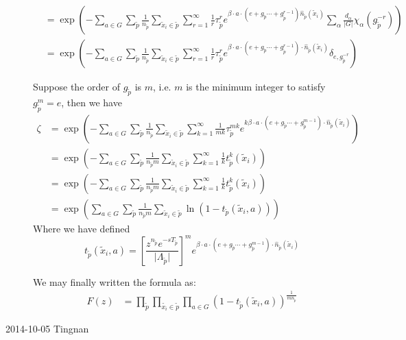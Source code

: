 \begin{description}
\begin{align*}
 & =\exp\left(-\sum_{a\in G}\sum_{\tilde{p}}\frac{1}{n_{\tilde{p}}}\sum_{\tilde{x}_{i}\in\tilde{p}}\sum_{r=1}^{\infty}\frac{1}{r}\tau_{\tilde{p}}^{r}e^{\beta\cdot a\cdot(e+g_{\tilde{p}}\cdots+g_{\tilde{p}}^{r-1})\hat{n}_{\tilde{p}}(\tilde{x}_{i})}\sum_{\alpha}\frac{d_{\alpha}}{\vert G\vert}\chi_{\alpha}(g_{\tilde{p}}^{-r})\right)\\
 & =\exp\left(-\sum_{a\in G}\sum_{\tilde{p}}\frac{1}{n_{\tilde{p}}}\sum_{\tilde{x}_{i}\in\tilde{p}}\sum_{r=1}^{\infty}\frac{1}{r}\tau_{\tilde{p}}^{r}e^{\beta\cdot a\cdot(e+g_{\tilde{p}}\cdots+g_{\tilde{p}}^{r-1})\cdot\hat{n}_{\tilde{p}}(\tilde{x}_{i})}\delta_{e,g_{\tilde{p}}^{-r}}\right)
\end{align*}


Suppose the order of $g_{\tilde{p}}$ is $m$, i.e. $m$ is the minimum
integer to satisfy $g_{\tilde{p}}^{m}=e$, then we have
\begin{align*}
\zeta & =\exp\left(-\sum_{a\in G}\sum_{\tilde{p}}\frac{1}{n_{\tilde{p}}}\sum_{\tilde{x}_{i}\in\tilde{p}}\sum_{k=1}^{\infty}\frac{1}{mk}\tau_{\tilde{p}}^{mk}e^{k\beta\cdot a\cdot(e+g_{\tilde{p}}\cdots+g_{\tilde{p}}^{m-1})\cdot\hat{n}_{\tilde{p}}(\tilde{x}_{i})}\right)\\
 & =\exp\left(-\sum_{a\in G}\sum_{\tilde{p}}\frac{1}{n_{\tilde{p}}m}\sum_{\tilde{x}_{i}\in\tilde{p}}\sum_{k=1}^{\infty}\frac{1}{k}t_{\tilde{p}}^{k}(\tilde{x}_{i})\right)\\
 & =\exp\left(-\sum_{a\in G}\sum_{\tilde{p}}\frac{1}{n_{\tilde{p}}m}\sum_{\tilde{x}_{i}\in\tilde{p}}\sum_{k=1}^{\infty}\frac{1}{k}t_{\tilde{p}}^{k}(\tilde{x}_{i})\right)\\
 & =\exp\left(\sum_{a\in G}\sum_{\tilde{p}}\frac{1}{n_{\tilde{p}}m}\sum_{\tilde{x}_{i}\in\tilde{p}}\ln\left(1-t_{\tilde{p}}(\tilde{x}_{i},a)\right)\right)
\end{align*}
Where we have defined
\[
t_{\tilde{p}}(\tilde{x}_{i},a)=\left[\frac{z^{n_{\tilde{p}}}e^{-sT_{\tilde{p}}}}{\vert\Lambda_{\tilde{p}}\vert}\right]^{m}e^{\beta\cdot a\cdot(e+g_{\tilde{p}}\cdots+g_{\tilde{p}}^{m-1})\cdot\hat{n}_{\tilde{p}}(\tilde{x}_{i})}
\]


We may finally written the formula as:
\begin{align*}
F(z) & =\prod_{\tilde{p}}\prod_{\tilde{x_{i}}\in\tilde{p}}\prod_{a\in G}\left(1-t_{\tilde{p}}(\tilde{x}_{i},a)\right)^{\frac{1}{mn_{\tilde{p}}}}
\end{align*}


\item[2014-10-05 Tingnan]



\end{description}
